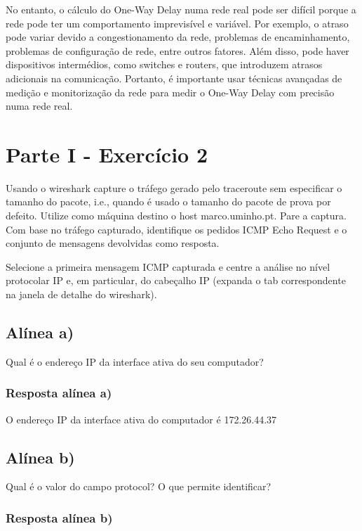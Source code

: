 \documentclass{article}
\begin{document}
No entanto, o cálculo do One-Way Delay numa rede real pode ser difícil porque a rede pode ter um comportamento imprevisível e variável. Por exemplo, o atraso pode variar devido a congestionamento da rede, problemas de encaminhamento, problemas de configuração de rede, entre outros fatores. Além disso, pode haver dispositivos intermédios, como switches e routers, que introduzem atrasos adicionais na comunicação. Portanto, é importante usar técnicas avançadas de medição e monitorização da rede para medir o One-Way Delay com precisão numa rede real.

\pagebreak 
 
\section{Parte I - Exercício 2}
Usando o wireshark capture o tráfego gerado pelo traceroute sem especificar o tamanho do pacote, i.e., quando é usado o tamanho
do pacote de prova por defeito. Utilize como máquina destino o host marco.uminho.pt. Pare a captura. Com base no tráfego
capturado, identifique os pedidos ICMP Echo Request e o conjunto de mensagens devolvidas como resposta.

Selecione a primeira mensagem ICMP capturada e centre a análise no nível protocolar IP e, em particular, do cabeçalho IP
(expanda o tab correspondente na janela de detalhe do wireshark).

\bigskip
\subsection{Alínea a)}

Qual é o endereço IP da interface ativa do seu computador?

\subsubsection{Resposta alínea a)}

O endereço IP da interface ativa do computador é 172.26.44.37

\subsection{Alínea b)}

Qual é o valor do campo protocol? O que permite identificar?

\subsubsection{Resposta alínea b)}
\end{document}
